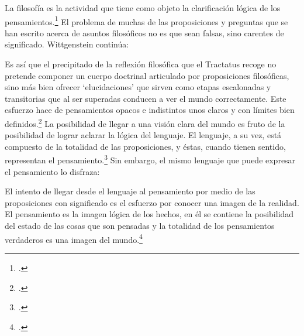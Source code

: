
La filosofía es la actividad que tiene como objeto la clarificación lógica
de los pensamientos.\footcite[4.112 p. 52]{tractatus} El problema de muchas de
las proposiciones y preguntas que se han escrito acerca de asuntos filosóficos
no es que sean falsas, sino carentes de significado. Wittgenstein continúa: 

Es así que el precipitado de la reflexión filosófica que el Tractatus recoge no
pretende componer un cuerpo doctrinal articulado por proposiciones filosóficas,
sino más bien ofrecer `elucidaciones' que sirven como etapas escalonadas y
transitorias que al ser superadas conducen a ver el mundo correctamente. Este
esfuerzo hace de pensamientos opacos e indistintos unos claros y con límites
bien definidos.\footcite[cf. 4.112 y 6.54]{tractatus} 
La posibilidad de llegar a una visión clara del mundo es fruto de la posibilidad
de lograr aclarar la lógica del lenguaje. El lenguaje, a su vez, está compuesto
de la totalidad de las proposiciones, y éstas, cuando tienen sentido,
representan el pensamiento.\footcite[cf. 4 y 4.001]{tractatus} 
Sin embargo, el mismo lenguaje que puede expresar el pensamiento lo disfraza:


El intento de llegar desde el lenguaje al pensamiento por medio de las
proposiciones con significado es el esfuerzo por conocer una imagen de la
realidad. El pensamiento es la imagen lógica de los hechos, en él se contiene la
posibilidad del estado de las cosas que son pensadas y la totalidad de los
pensamientos verdaderos es una imagen del mundo.\footcite[cf.][3 y
3.001]{tractatus}

